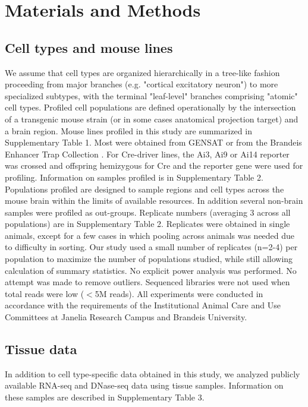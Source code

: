 \section{Materials and Methods}

\subsection{Cell types and mouse lines}
We assume that cell types are organized hierarchically in a tree-like fashion proceeding from major branches (e.g. "cortical excitatory neuron") to more specialized subtypes, with the terminal "leaf-level" branches comprising "atomic" cell types. Profiled cell populations are defined operationally by the intersection of a transgenic mouse strain (or in some cases anatomical projection target) and a brain region. Mouse lines profiled in this study are summarized in Supplementary Table 1. Most were obtained from GENSAT \citep{Gong_2007} or from the Brandeis Enhancer Trap Collection \citep{Shima_2016}. For Cre-driver lines, the Ai3, Ai9 or Ai14 reporter \citep{Madisen_2009} was crossed and offspring hemizygous for Cre and the reporter gene were used for profiling. Information on samples profiled is in Supplementary Table 2. Populations profiled are designed to sample regions and cell types across the mouse brain within the limits of available resources. In addition several non-brain samples were profiled as out-groups. Replicate numbers (averaging 3 across all populations) are in Supplementary Table 2. Replicates were obtained in single animals, except for a few cases in which pooling across animals was needed due to difficulty in sorting. Our study used a small number of replicates (n=2-4) per population to maximize the number of populations studied, while still allowing calculation of summary statistics. No explicit power analysis was performed. No attempt was made to remove outliers. Sequenced libraries were not used when total reads were low ($<$5M reads). All experiments were conducted in accordance with the requirements of the Institutional Animal Care and Use Committees at Janelia Research Campus and Brandeis University.

\subsection{Tissue data}
In addition to cell type-specific data obtained in this study, we analyzed publicly available RNA-seq and DNase-seq data using tissue samples. Information on these samples are described in Supplementary Table 3.

